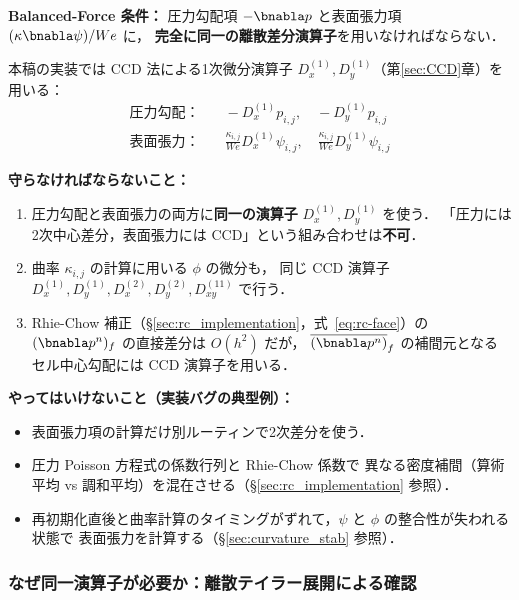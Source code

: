 \begin{tcolorbox}[warnbox, title={Balanced-Force 条件：実装上の最重要事項}]
\textbf{Balanced-Force 条件：}
圧力勾配項 $-\bnabla p$ と表面張力項 $(\kappa\bnabla\psi)/We$ に，
\textbf{完全に同一の離散差分演算子}を用いなければならない．

本稿の実装では CCD 法による1次微分演算子 $D_x^{(1)}, D_y^{(1)}$（第\ref{sec:CCD}章）を用いる：
\begin{align}
  \text{圧力勾配：} & \quad
    -D_x^{(1)} p_{i,j}, \quad -D_y^{(1)} p_{i,j}
    \label{eq:balanced_pressure} \\
  \text{表面張力：} & \quad
    \frac{\kappa_{i,j}}{We} D_x^{(1)} \psi_{i,j}, \quad
    \frac{\kappa_{i,j}}{We} D_y^{(1)} \psi_{i,j}
    \label{eq:balanced_surface}
\end{align}

\textbf{守らなければならないこと：}
\begin{enumerate}
  \item 圧力勾配と表面張力の両方に\textbf{同一の演算子} $D_x^{(1)}, D_y^{(1)}$ を使う．
        「圧力には2次中心差分，表面張力には CCD」という組み合わせは\textbf{不可}．
  \item 曲率 $\kappa_{i,j}$ の計算に用いる $\phi$ の微分も，
        同じ CCD 演算子 $D_x^{(1)}, D_y^{(1)}, D_x^{(2)}, D_y^{(2)}, D_{xy}^{(11)}$ で行う．
  \item Rhie-Chow 補正（§\ref{sec:rc_implementation}，式~\eqref{eq:rc-face}）の
        $(\bnabla p^n)_f$ の直接差分は $O(h^2)$ だが，
        $\overline{(\bnabla p^n)}_f$ の補間元となるセル中心勾配には CCD 演算子を用いる．
\end{enumerate}

\textbf{やってはいけないこと（実装バグの典型例）：}
\begin{itemize}
  \item 表面張力項の計算だけ別ルーティンで2次差分を使う．
  \item 圧力 Poisson 方程式の係数行列と Rhie-Chow 係数で
        異なる密度補間（算術平均 vs 調和平均）を混在させる（§\ref{sec:rc_implementation} 参照）．
  \item 再初期化直後と曲率計算のタイミングがずれて，$\psi$ と $\phi$ の整合性が失われる状態で
        表面張力を計算する（§\ref{sec:curvature_stab} 参照）．
\end{itemize}
\end{tcolorbox}

\subsubsection{なぜ同一演算子が必要か：離散テイラー展開による確認}

